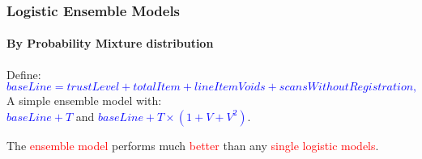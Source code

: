 \documentclass{beamer}
\begin{document}
\begin{frame}
\frametitle{ Logistic Ensemble Models }
\framesubtitle{By Probability Mixture distribution}
\vspace{-0.5em}
Define:
\vspace{-0.5em}
\textcolor{blue}{
\begin{equation*}
baseLine = trustLevel + totalItem + lineItemVoids + scansWithoutRegistration,
\end{equation*}
}
A simple ensemble model with:\\
 \textcolor{blue}{$baseLine + T $} and \textcolor{blue}{$baseLine + T \times (1 + V + V^2)$}.
\begin{table}[H]
\end{table}

The \textcolor{red}{ensemble model} performs much \textcolor{red}{better} than any \textcolor{red}{single logistic models}.


\end{frame}
\end{document}
